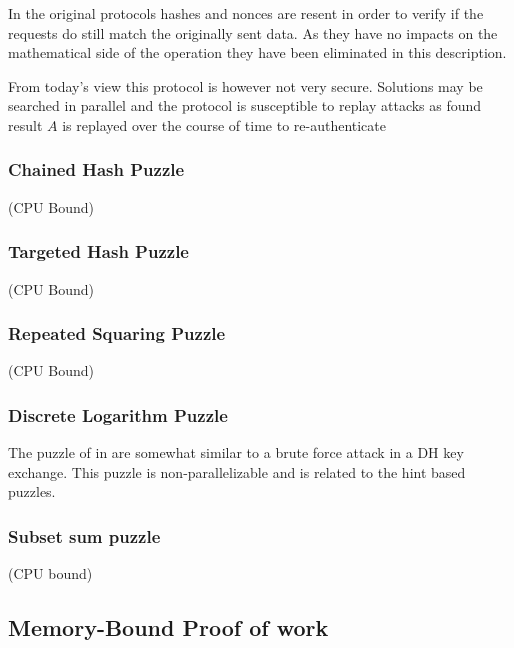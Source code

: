 In the original protocols hashes and nonces are resent in order to verify if the requests do still match the originally sent data. As they have no impacts on the mathematical side of the operation they have been eliminated in this description.

From today's view this protocol is however not very secure. Solutions may be searched in parallel and the protocol is susceptible to replay attacks as found result $A$ is replayed over the course of time to re-authenticate 

\subsubsection{Chained Hash Puzzle} 
\cite{groza2006} (CPU Bound)


\subsubsection{Targeted Hash Puzzle} 

\cite{4301429} (CPU Bound)


\subsubsection{Repeated Squaring Puzzle} 

\cite{rivest1996time} (CPU Bound)


\subsubsection{Discrete Logarithm Puzzle} 
The puzzle of \citeauthor{waters2004new} in \cite{waters2004new} are somewhat similar to a brute force attack in a DH key exchange. This puzzle is non-parallelizable and is related to the hint based puzzles.


\subsubsection{Subset sum puzzle} 

\cite{tritilanunt2007toward} (CPU bound)


\subsection{Memory-Bound Proof of work}
